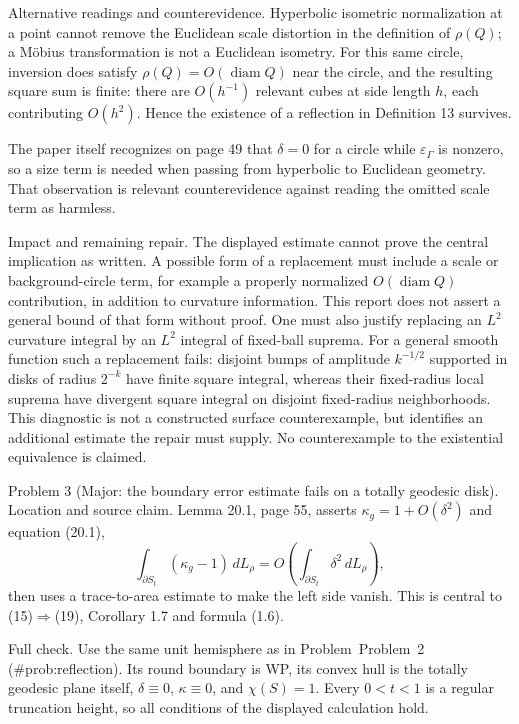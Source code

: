 \documentclass[10pt]{article}
\begin{document}
Alternative readings and counterevidence. Hyperbolic isometric normalization at a point cannot remove the Euclidean scale distortion in the definition of \(\rho(Q)\); a Möbius transformation is not a Euclidean isometry. For this same circle, inversion does satisfy \(\rho(Q)=O(\operatorname{diam}Q)\) near the circle, and the resulting square sum is finite: there are \(O(h^{-1})\) relevant cubes at side length \(h\), each contributing \(O(h^2)\). Hence the existence of a reflection in Definition 13 survives.\par
The paper itself recognizes on page 49 that \(\delta=0\) for a circle while \(\varepsilon_\Gamma\) is nonzero, so a size term is needed when passing from hyperbolic to Euclidean geometry. That observation is relevant counterevidence against reading the omitted scale term as harmless.\par
Impact and remaining repair. The displayed estimate cannot prove the central implication as written. A possible form of a replacement must include a scale or background-circle term, for example a properly normalized \(O(\operatorname{diam}Q)\) contribution, in addition to curvature information. This report does not assert a general bound of that form without proof. One must also justify replacing an \(L^2\) curvature integral by an \(L^2\) integral of fixed-ball suprema. For a general smooth function such a replacement fails: disjoint bumps of amplitude \(k^{-1/2}\) supported in disks of radius \(2^{-k}\) have finite square integral, whereas their fixed-radius local suprema have divergent square integral on disjoint fixed-radius neighborhoods. This diagnostic is not a constructed surface counterexample, but identifies an additional estimate the repair must supply. No counterexample to the existential equivalence is claimed.\par
Problem 3 (Major: the boundary error estimate fails on a totally geodesic disk).  Location and source claim. Lemma 20.1, page 55, asserts \(\kappa_g=1+O(\delta^2)\) and equation (20.1), \[\int_{\partial S_t}(\kappa_g-1)\,dL_\rho
       =O\!\left(\int_{\partial S_t}\delta^2\,dL_\rho\right),\] then uses a trace-to-area estimate to make the left side vanish. This is central to (15)\(\Rightarrow\)(19), Corollary 1.7 and formula (1.6).\par
Full check. Use the same unit hemisphere as in Problem Problem 2 (\#prob:reflection). Its round boundary is WP, its convex hull is the totally geodesic plane itself, \(\delta\equiv0\), \(\kappa\equiv0\), and \(\chi(S)=1\). Every \(0<t<1\) is a regular truncation height, so all conditions of the displayed calculation hold.\par
\end{document}
